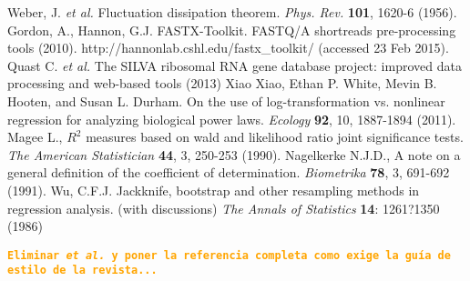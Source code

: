 \documentclass[12pt,oneside,letterpaper]{article}
\newcommand{\todo}[1]{\texttt{\bfseries\textcolor{Orange}{#1}}}
\begin{document}
\begin{thebibliography}{99}
	 Weber, J. \textit{et al.} Fluctuation dissipation theorem. {\it Phys. Rev.} {\bf 101}, 1620-6 (1956).
	 Gordon, A., Hannon, G.J. FASTX-Toolkit. FASTQ/A shortreads pre-processing tools (2010). http://hannonlab.cshl.edu/fastx\_toolkit/ (accessed 23 Feb 2015).
	 Quast C.  \textit{et al.} The SILVA ribosomal RNA gene database project: improved data processing and web-based tools (2013)
 	 Xiao Xiao, Ethan P. White, Mevin B. Hooten, and Susan L. Durham. On the use of log-transformation vs. nonlinear regression for analyzing biological power laws. {\it Ecology} {\bf 92}, 10, 1887-1894 (2011).
 	 Magee L., $R^2$ measures based on wald and likelihood ratio joint significance tests. {\it The American Statistician} {\bf 44}, 3, 250-253 (1990).
	 Nagelkerke N.J.D., A note on a general definition of the coefficient of determination. {\it Biometrika} {\bf 78}, 3, 691-692 (1991).
	 Wu, C.F.J. Jackknife, bootstrap and other resampling methods in regression analysis. (with discussions) \textit{The Annals of Statistics} {\bf 14}: 1261?1350 (1986)
\end{thebibliography}
\todo{Eliminar \textit{et al.} y poner la referencia completa como exige la guía de estilo de la revista...}
\end{document}
